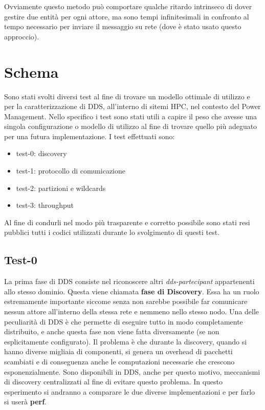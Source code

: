 Ovviamente questo metodo può comportare qualche ritardo intrinseco di dover gestire due entità per ogni attore, ma sono tempi infinitesimali in confronto al tempo necessario per inviare il messaggio su rete (dove è stato usato questo approccio).

\section{Schema}
Sono stati svolti diversi test al fine di trovare un modello ottimale di utilizzo e per la caratterizzazione di DDS, all'interno di sitemi HPC, nel contesto del Power Management. Nello specifico i test sono stati utili a capire il peso che avesse una singola configurazione o modello di utilizzo al fine di trovare quello più adeguato per una futura implementazione. I test effettuati sono:

\begin{itemize}
    \item test-0: discovery
    \item test-1: protocollo di comunicazione
    \item test-2: partizioni e wildcards
    \item test-3: throughput
\end{itemize}


Al fine di condurli nel modo più trasparente e corretto possibile sono stati resi pubblici \cite{mygit} tutti i codici utilizzati durante lo svolgimento di questi test. %


\subsection{Test-0}
La prima fase di DDS consiste nel riconoscere altri \emph{dds-partecipant} appartenenti allo stesso dominio. Questa viene chiamata \textbf{fase di Discovery}. Essa ha un ruolo estremamente importante siccome senza non sarebbe possibile far comunicare nessun attore all'interno della stessa rete e nemmeno nello stesso nodo. Una delle peculiarità di DDS è che permette di eseguire tutto in modo completamente distribuito, e anche questa fase non viene fatta diversamente (se non esplicitamente configurato). Il problema è che durante la discovery, quando si hanno diverse migliaia di componenti, si genera un overhead di pacchetti scambiati e di conseguenza anche le computazioni necessarie che crescono esponenzialmente. %
Sono disponibili in DDS, anche per questo motivo, meccanismi di discovery centralizzati al fine di evitare questo problema. In questo esperimento si andranno a comparare le due diverse implementazioni e per farlo si userà \textbf{perf}.

